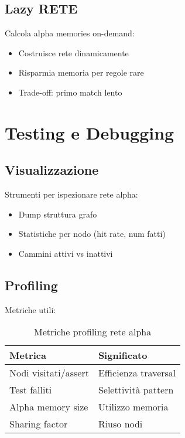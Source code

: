 \subsection{Lazy RETE}

Calcola alpha memories on-demand:

\begin{itemize}
\item Costruisce rete dinamicamente
\item Risparmia memoria per regole rare
\item Trade-off: primo match lento
\end{itemize}

\section{Testing e Debugging}

\subsection{Visualizzazione}

Strumenti per ispezionare rete alpha:

\begin{itemize}
\item Dump struttura grafo
\item Statistiche per nodo (hit rate, num fatti)
\item Cammini attivi vs inattivi
\end{itemize}

\subsection{Profiling}

Metriche utili:

\begin{table}[h]
\centering
\begin{tabular}{@{}ll@{}}
\toprule
\textbf{Metrica} & \textbf{Significato} \\
\midrule
Nodi visitati/assert & Efficienza traversal \\
Test falliti & Selettività pattern \\
Alpha memory size & Utilizzo memoria \\
Sharing factor & Riuso nodi \\
\bottomrule
\end{tabular}
\caption{Metriche profiling rete alpha}
\end{table}

